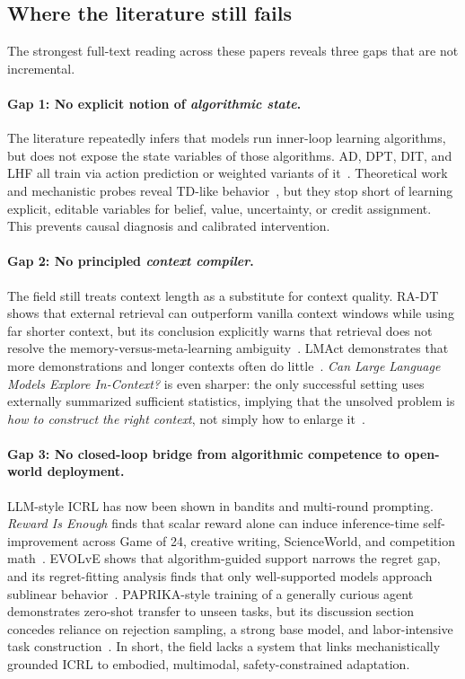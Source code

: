 \documentclass[10pt,twocolumn,letterpaper]{article}
\begin{document}
\subsection{Where the literature still fails}
The strongest full-text reading across these papers reveals three gaps that are not incremental.

\paragraph{Gap 1: No explicit notion of \emph{algorithmic state}.}
The literature repeatedly infers that models run inner-loop learning algorithms, but does not expose the state variables of those algorithms. AD, DPT, DIT, and LHF all train via action prediction or weighted variants of it~\cite{laskin2022ad,lee2024dpt,dong2024dit,chen2025lhf}. Theoretical work and mechanistic probes reveal TD-like behavior~\cite{lin2023provableicrl,wang2024td,demircan2024sae}, but they stop short of learning explicit, editable variables for belief, value, uncertainty, or credit assignment. This prevents causal diagnosis and calibrated intervention.

\paragraph{Gap 2: No principled \emph{context compiler}.}
The field still treats context length as a substitute for context quality. RA-DT shows that external retrieval can outperform vanilla context windows while using far shorter context, but its conclusion explicitly warns that retrieval does not resolve the memory-versus-meta-learning ambiguity~\cite{schmied2024radt}. LMAct demonstrates that more demonstrations and longer contexts often do little~\cite{ruoss2024lmact}. \emph{Can Large Language Models Explore In-Context?} is even sharper: the only successful setting uses externally summarized sufficient statistics, implying that the unsolved problem is \emph{how to construct the right context}, not simply how to enlarge it~\cite{krishnamurthy2024explore}.

\paragraph{Gap 3: No closed-loop bridge from algorithmic competence to open-world deployment.}
LLM-style ICRL has now been shown in bandits and multi-round prompting. \emph{Reward Is Enough} finds that scalar reward alone can induce inference-time self-improvement across Game of 24, creative writing, ScienceWorld, and competition math~\cite{song2025reward}. EVOLvE shows that algorithm-guided support narrows the regret gap, and its regret-fitting analysis finds that only well-supported models approach sublinear behavior~\cite{nie2024evolve}. PAPRIKA-style training of a generally curious agent demonstrates zero-shot transfer to unseen tasks, but its discussion section concedes reliance on rejection sampling, a strong base model, and labor-intensive task construction~\cite{tajwar2025paprika}. In short, the field lacks a system that links mechanistically grounded ICRL to embodied, multimodal, safety-constrained adaptation.
\end{document}
